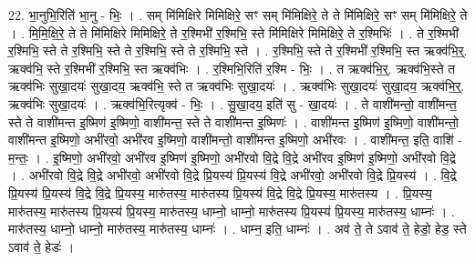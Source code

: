 \documentclass[17pt]{extarticle}
\begin{document}
22. भा॒नुभि॒रिति॑ भा॒नु - भिः॒ । . सम् मि॑मिक्षिरे मिमिक्षिरे॒ सꣳ सम् मि॑मिक्षिरे॒ ते ते मि॑मिक्षिरे॒ सꣳ सम् मि॑मिक्षिरे॒ ते । . मि॒मि॒क्षि॒रे॒ ते ते मि॑मिक्षिरे मिमिक्षिरे॒ ते र॒श्मिभी॑ र॒श्मिभि॒ स्ते मि॑मिक्षिरे मिमिक्षिरे॒ ते र॒श्मिभिः॑ । . ते र॒श्मिभी॑ र॒श्मिभि॒ स्ते ते र॒श्मिभि॒ स्ते ते र॒श्मिभि॒ स्ते ते र॒श्मिभि॒ स्ते । . र॒श्मिभि॒ स्ते ते र॒श्मिभी॑ र॒श्मिभि॒ स्त ऋक्व॑भि॒र्॒. ऋक्व॑भि॒ स्ते र॒श्मिभी॑ र॒श्मिभि॒ स्त ऋक्व॑भिः । . र॒श्मिभि॒रिति॑ र॒श्मि - भिः॒ । . त ऋक्व॑भि॒र्॒. ऋक्व॑भि॒स्ते त ऋक्व॑भिः सुखा॒दयः॑ सुखा॒दय॒ ऋक्व॑भि॒ स्ते त ऋक्व॑भिः सुखा॒दयः॑ । . ऋक्व॑भिः सुखा॒दयः॑ सुखा॒दय॒ ऋक्व॑भि॒र्॒. ऋक्व॑भिः सुखा॒दयः॑ । . ऋक्व॑भि॒रित्यृक्व॑ - भिः॒ । . सु॒खा॒दय॒ इति॑ सु - खा॒दयः॑ । . ते वाशी॑मन्तो॒ वाशी॑मन्त॒ स्ते ते वाशी॑मन्त इ॒ष्मिण॑ इ॒ष्मिणो॒ वाशी॑मन्त॒ स्ते ते वाशी॑मन्त इ॒ष्मिणः॑ । . वाशी॑मन्त इ॒ष्मिण॑ इ॒ष्मिणो॒ वाशी॑मन्तो॒ वाशी॑मन्त इ॒ष्मिणो॒ अभी॑रवो॒ अभी॑रव इ॒ष्मिणो॒ वाशी॑मन्तो॒ वाशी॑मन्त इ॒ष्मिणो॒ अभी॑रवः । . वाशी॑मन्त॒ इति॒ वाशि॑ - म॒न्तः॒ । . इ॒ष्मिणो॒ अभी॑रवो॒ अभी॑रव इ॒ष्मिण॑ इ॒ष्मिणो॒ अभी॑रवो वि॒द्रे वि॒द्रे अभी॑रव इ॒ष्मिण॑ इ॒ष्मिणो॒ अभी॑रवो वि॒द्रे । . अभी॑रवो वि॒द्रे वि॒द्रे अभी॑रवो॒ अभी॑रवो वि॒द्रे प्रि॒यस्य॑ प्रि॒यस्य॑ वि॒द्रे अभी॑रवो॒ अभी॑रवो वि॒द्रे प्रि॒यस्य॑ । . वि॒द्रे प्रि॒यस्य॑ प्रि॒यस्य॑ वि॒द्रे वि॒द्रे प्रि॒यस्य॒ मारु॑तस्य॒ मारु॑तस्य प्रि॒यस्य॑ वि॒द्रे वि॒द्रे प्रि॒यस्य॒ मारु॑तस्य । . प्रि॒यस्य॒ मारु॑तस्य॒ मारु॑तस्य प्रि॒यस्य॑ प्रि॒यस्य॒ मारु॑तस्य॒ धाम्नो॒ धाम्नो॒ मारु॑तस्य प्रि॒यस्य॑ प्रि॒यस्य॒ मारु॑तस्य॒ धाम्नः॑ । . मारु॑तस्य॒ धाम्नो॒ धाम्नो॒ मारु॑तस्य॒ मारु॑तस्य॒ धाम्नः॑ । . धाम्न॒ इति॒ धाम्नः॑ । . अव॑ ते॒ ते ऽवाव॑ ते॒ हेडो॒ हेड॒ स्ते ऽवाव॑ ते॒ हेडः॑ । \newline
\end{document}
